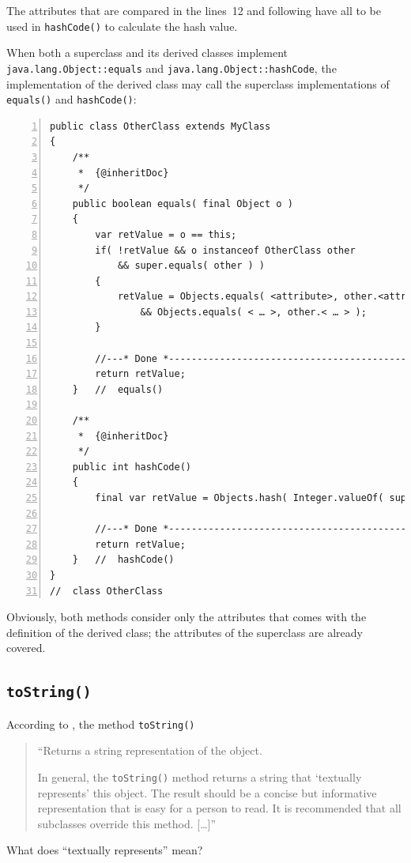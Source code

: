 \documentclass[11pt,a4paper, titlepage, parskip=half, headsepline, footsepline, cleardoublepage=current, headheight=1cm]{scrbook}
\begin{document}
The attributes that are compared in the lines~12 and following have all to be used in \lstinline|hashCode()| to calculate the hash value.

When both a superclass and its derived classes implement \lstinline|java.lang.Object::equals| and \lstinline|java.lang.Object::hashCode|, the implementation of the derived class may call the superclass implementations of \lstinline|equals()| and \lstinline|hashCode()|:
\begin{lstlisting}[numbers=left]
public class OtherClass extends MyClass
{
    /**
     *  {@inheritDoc}
     */
    public boolean equals( final Object o )
    {
        var retValue = o == this;
        if( !retValue && o instanceof OtherClass other
            && super.equals( other ) )
        {
            retValue = Objects.equals( <attribute>, other.<attribute> )
                && Objects.equals( < … >, other.< … > );
        }
            
        //---* Done *------------------------------------------------
        return retValue;
    }   //  equals()
    
    /**
     *  {@inheritDoc}
     */
    public int hashCode()
    {
        final var retValue = Objects.hash( Integer.valueOf( super.hashCode ), <attribute>, < … > );
        
        //---* Done *------------------------------------------------
        return retValue;
    }   //  hashCode()    
}
//  class OtherClass
\end{lstlisting}
Obviously, both methods consider only the attributes that comes with the definition of the derived class; the attributes of the superclass are already covered.

\subsection{\lstinline|toString()|}\label{sec:ToString}
According to \autocite{ORACLE_DOC_OBJECT:toString}, the method \lstinline|toString()|
\begin{quotation}
“Returns a string representation of the object.

In general, the \lstinline|toString()| method returns a string that ‘textually represents’ this object. The result should be a concise but informative representation that is easy for a person to read. It is recommended that all subclasses override this method. […]”
\end{quotation}

What does “textually represents” mean?
\end{document}
